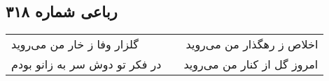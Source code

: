 \begin{center}
\section*{رباعی شماره ۳۱۸}
\label{sec:sh318}
\begin{longtable}{l p{0.5cm} r}
گلزار وفا ز خار من می‌روید
&&
اخلاص ز رهگذار من می‌روید
\\
در فکر تو دوش سر به زانو بودم
&&
امروز گل از کنار من می‌روید
\\
\end{longtable}
\end{center}
